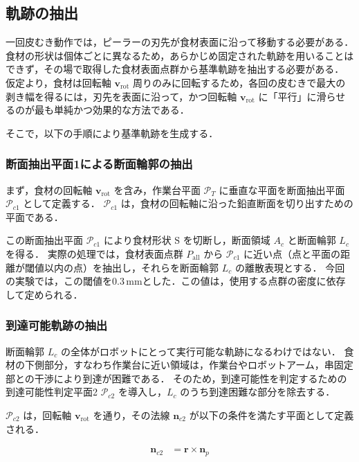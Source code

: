 \subsection{軌跡の抽出}
\label{sec:peeling_trajectory}

一回皮むき動作では，ピーラーの刃先が食材表面に沿って移動する必要がある．
食材の形状は個体ごとに異なるため，あらかじめ固定された軌跡を用いることはできず，その場で取得した食材表面点群から基準軌跡を抽出する必要がある．
仮定より，食材は回転軸 $\mathbf{v}_{\mathrm{rot}}$ 周りのみに回転するため，各回の皮むきで最大の剥き幅を得るには，刃先を表面に沿って，かつ回転軸 $\mathbf{v}_{\mathrm{rot}}$ に「平行」に滑らせるのが最も単純かつ効果的な方法である．

そこで，以下の手順により基準軌跡を生成する．

\subsubsection{断面抽出平面1による断面輪郭の抽出}

まず，食材の回転軸 $\mathbf{v}_{\mathrm{rot}}$ を含み，作業台平面 $\mathcal{P}_T$ に垂直な平面を断面抽出平面 $\mathcal{P}_{c1}$ として定義する．
$\mathcal{P}_{c1}$ は，食材の回転軸に沿った鉛直断面を切り出すための平面である．

この断面抽出平面 $\mathcal{P}_{c1}$ により食材形状 $\mathrm{S}$ を切断し，断面領域 $A_c$ と断面輪郭 $L_c$ を得る．
実際の処理では，食材表面点群 $P_{\mathrm{all}}$ から $\mathcal{P}_{c1}$ に近い点（点と平面の距離が閾値以内の点）を抽出し，それらを断面輪郭 $L_c$ の離散表現とする．
今回の実験では，この閾値を0.3\,mmとした．この値は，使用する点群の密度に依存して定められる．

\subsubsection{到達可能軌跡の抽出}

断面輪郭 $L_c$ の全体がロボットにとって実行可能な軌跡になるわけではない．
食材の下側部分，すなわち作業台に近い領域は，作業台やロボットアーム，串固定部との干渉により到達が困難である．
そのため，到達可能性を判定するための到達可能性判定平面2 $\mathcal{P}_{c2}$ を導入し，$L_c$ のうち到達困難な部分を除去する．

$\mathcal{P}_{c2}$ は，回転軸 $\mathbf{v}_{\mathrm{rot}}$ を通り，その法線 $\mathbf{n}_{c2}$ が以下の条件を満たす平面として定義される．

\begin{align}
  \mathbf{n}_{c2} &= \mathbf{r} \times \mathbf{n}_p \label{eq:peeling_cut_plane_2}
\end{align}

